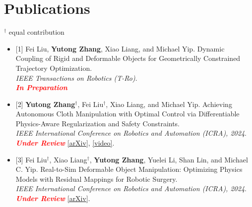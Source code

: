 \documentclass[letterpaper,11pt]{article}
\newcommand{\resumeItem}[1]{
    \item\small{
        {#1 \vspace{-1.5pt}}
    }
}
\newcommand{\resumeSubItem}[1]{\resumeItem{#1}\vspace{-2pt}}
\newcommand{\resumeSubHeadingListStart}{\begin{itemize}[leftmargin=0in, label={}]}
\newcommand{\resumeSubHeadingListEnd}{\end{itemize}}
\begin{document}
\section{Publications}
    $^\dagger$ equal contribution
    \vspace{-3pt}
    \resumeSubHeadingListStart
        \resumeSubItem{
            {[1]} Fei Liu, \textbf{Yutong Zhang}, Xiao Liang, and Michael Yip.
            Dynamic Coupling of Rigid and Deformable Objects for Geometrically Constrained Trajectory Optimization.\\
            \textit{IEEE Transactions on Robotics (T-Ro)}.\\
            \textit{\textbf{\textcolor{red}{In Preparation}}}\hspace{.5pt}
        }
        \resumeSubItem{
            {[2]} \textbf{Yutong Zhang}$^\dagger$, Fei Liu$^\dagger$, Xiao Liang, and Michael Yip.
            Achieving Autonomous Cloth Manipulation with Optimal Control via Differentiable Physics-Aware Regularization and Safety Constraints.\\
            \textit{IEEE International Conference on Robotics and Automation (ICRA), 2024}.\\
            \textit{\textbf{\textcolor{red}{Under Review}}}\hspace{.5pt}
            \href{https://arxiv.org/pdf/2309.11655.pdf}
            {\faFilePdfO \hspace{.5pt} [arXiv]},
            \href{https://www.youtube.com/watch?v=za2I0Kx4Co4}
            {\faYoutubePlay \hspace{.5pt} [video]}.
        }

        \resumeSubItem{
            {[3]} Fei Liu$^\dagger$, Xiao Liang$^\dagger$, \textbf{Yutong Zhang}, Yuelei Li, Shan Lin, and Michael C. Yip.
            Real-to-Sim Deformable Object Manipulation: Optimizing Physics Models with Residual Mappings for Robotic Surgery.\\
            \textit{IEEE International Conference on Robotics and Automation (ICRA), 2024}.\\
            \textit{\textbf{\textcolor{red}{Under Review}}}\hspace{.5pt}
            \href{https://arxiv.org/pdf/2309.11656.pdf}
            {\faFilePdfO \hspace{.5pt} [arXiv]}.
        }
    \resumeSubHeadingListEnd


\end{document}
